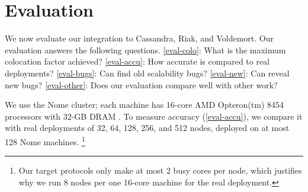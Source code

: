 

\section{Evaluation}
\label{sec-sck-eval}


We now evaluate our \sck integration to Cassandra, Riak,
and Voldemort.  Our evaluation answers the following questions.
%
\sec\ref{eval-colo}: What is the maximum colocation factor achieved?
%
\sec\ref{eval-accu}: How accurate is \sck compared to real deployments?
%
\sec\ref{eval-bugs}: Can \sck find old scalability bugs?
%
\sec\ref{eval-new}: Can \sck reveal new bugs?
%
%
\sec\ref{eval-other}: Does our evaluation compare well with other work?


We use the Nome cluster; each machine has 16-core AMD Opteron(tm) 8454
processors with 32-GB DRAM \cite{NomeNodes}.
%
To measure \sck accuracy (\sec\ref{eval-accu}), we compare it with real
deployments of 32, 64, 128, 256, and 512 nodes, deployed on at most 128 Nome
machines.  
%
\footnote{Our target protocols only make at most 2 busy cores per
node, which justifies why we run 8 nodes per one 16-core machine for the real
deployment. }
%





%

